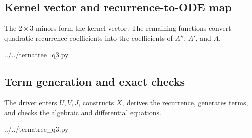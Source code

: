 \documentclass[11pt,fleqn]{article}
\theoremstyle{plain}
\begin{document}
\clearpage
\subsection{Kernel vector and recurrence-to-ODE map}
The $2\times3$ minors form the kernel vector.  The remaining functions convert
quadratic recurrence coefficients into the coefficients of $A''$, $A'$, and
$A$.
\par\medskip\noindent
\begin{minipage}[t]{\textwidth}

{../../ternatree_q3.py}
\end{minipage}

\clearpage
\subsection{Term generation and exact checks}
The driver enters $U,V,J$, constructs $X$, derives the recurrence, generates
terms, and checks the algebraic and differential equations.
\par\medskip\noindent
\begin{minipage}[t]{\textwidth}

{../../ternatree_q3.py}
\end{minipage}
\end{document}
